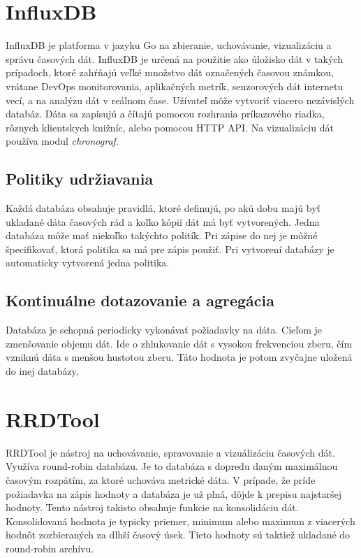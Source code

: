 \documentclass[11pt,final,oneside]{fithesis}
\begin{document}
\section{InfluxDB}
InfluxDB je platforma v jazyku Go na zbieranie, uchovávanie, vizualizáciu a správu časových dát. InfluxDB je určená na použitie ako úložisko dát v takých prípadoch, ktoré zahŕňajú veľké množstvo
dát označených časovou známkou, vrátane DevOps monitorovania, aplikačných metrík, senzorových dát internetu vecí, a na analýzu dát v reálnom čase.\cite{21} Užívateľ môže vytvoriť viacero nezávislých databáz. 
Dáta sa zapisujú a čítajú pomocou rozhrania príkazového riadka, rôznych klientskych knižníc, alebo pomocou HTTP API. Na vizualizáciu dát používa modul \emph{chronograf}.

\subsection{Politiky udržiavania}
Každá databáza obsahuje pravidlá, ktoré definujú, po akú dobu majú byť ukladané dáta časových rád a koľko kópií dát má byť vytvorených. Jedna databáza môže mať niekoľko takýchto politík. Pri zápise 
do nej je môžné špecifikovať, ktorá politika sa má pre zápis použiť. Pri vytvorení databázy je automaticky vytvorená jedna politika.

\subsection{Kontinuálne dotazovanie a agregácia}
Databáza je schopná periodicky vykonávať požiadavky na dáta. Cieľom je zmenšovanie objemu dát. Ide o zhlukovanie dát s vysokou frekvenciou zberu, čím vzniknú dáta s menšou hustotou zberu. Táto hodnota je 
potom zvyčajne uložená do inej databázy.

\section{RRDTool}
RRDTool je nástroj na uchovávanie, spravovanie a vizuálizáciu časových dát. Využíva round-robin databázu. Je to databáza s dopredu daným maximálnou časovým rozpätím, za ktoré uchováva metrické dáta.
V prípade, že príde požiadavka na zápis hodnoty 
a databáza je už plná, dôjde k prepisu najstaršej hodnoty. Tento nástroj takisto obsahuje funkcie na konsolidáciu dát. Konsolidovaná hodnota je typicky priemer, minimum alebo maximum z viacerých hodnôt zozbieraných 
za dlhší časový úsek. Tieto hodnoty sú taktiež ukladané do round-robin archívu.
\end{document}
